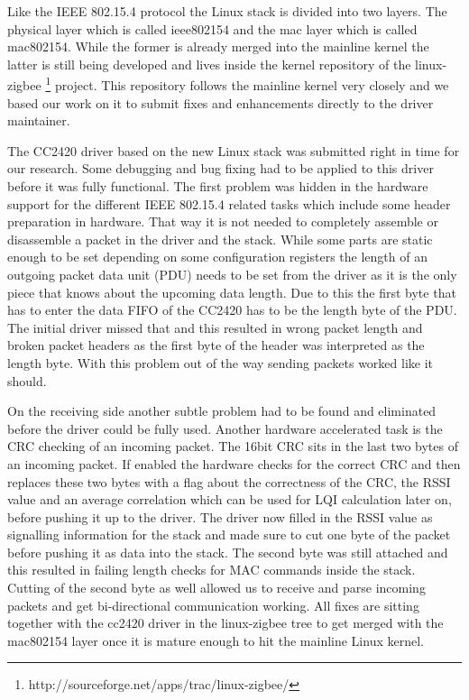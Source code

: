 Like the IEEE 802.15.4 protocol the Linux stack is divided into two layers. The
physical layer which is called ieee802154 and the mac layer which is called
mac802154. While the former is already merged into the mainline kernel the latter
is still being developed and lives inside the kernel repository of the
linux-zigbee \footnote{http://sourceforge.net/apps/trac/linux-zigbee/} project.
This repository follows the mainline kernel very closely
and we based our work on it to submit fixes and enhancements directly to the
driver maintainer.

The CC2420 driver based on the new Linux stack was submitted right in time for
our research. Some debugging and bug fixing had to be applied to this driver
before it was fully functional. The first problem was hidden in the hardware
support for the different IEEE 802.15.4 related tasks which include
some header preparation in hardware. That way it is not needed to
completely assemble or disassemble a packet in the driver and the stack. While
some parts are static enough to be set depending on some configuration registers
the length of an outgoing packet data unit (PDU) needs to be set from the driver
as it is the only piece that knows about the upcoming data length. Due to this
the first byte that has to enter the data FIFO of the CC2420 has to be the
length byte of the PDU. The initial driver missed that and this resulted in
wrong packet length and broken packet headers as the first byte of the header
was interpreted as the length byte. With this problem out of the way sending
packets worked like it should.

On the receiving side another subtle problem had to be found and eliminated
before the driver could be fully used. Another hardware accelerated task is the
CRC checking of an incoming packet. The 16bit CRC sits in the last two bytes of
an incoming packet. If enabled the hardware checks for the correct CRC and
then replaces these two bytes with a flag about the correctness of the CRC, the
RSSI value and an average correlation which can be used for LQI calculation
later on, before pushing it up to the driver. The driver now filled in the RSSI
value as signalling information for the stack and made sure to cut one byte
of the packet before pushing it as data into the stack. The second byte was
still attached and this resulted in failing length checks for MAC commands
inside the stack. Cutting of the second byte as well allowed us to receive
and parse incoming packets and get bi-directional communication working. All
fixes are sitting together with the cc2420 driver in the linux-zigbee tree to
get merged with the mac802154 layer once it is mature enough to hit the
mainline Linux kernel.

